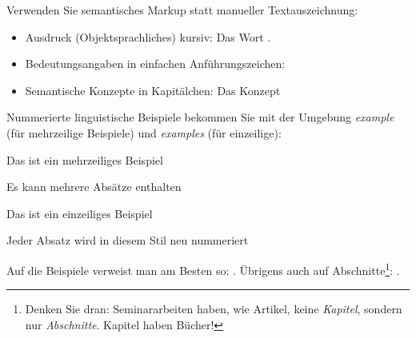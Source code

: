 \documentclass[naustrian]{univie-ling-paper}
\begin{document}
Verwenden Sie semantisches Markup statt manueller Textauszeichnung:
\begin{itemize}
	\item Ausdruck (Objektsprachliches) kursiv: Das Wort .
	\item Bedeutungsangaben in einfachen Anführungszeichen: 
	\item Semantische Konzepte in Kapitälchen: Das Konzept 
\end{itemize}
%
Nummerierte linguistische Beispiele bekommen Sie mit der Umgebung \emph{example} (für mehrzeilige Beispiele) und \emph{examples} (für einzeilige):

\begin{example}
	Das ist ein mehrzeiliges Beispiel
	
	Es kann mehrere Absätze enthalten
\end{example}

\begin{examples}
	\item Das ist ein einzeiliges Beispiel\label{exa:Beispiel-einzeilig}
	\item Jeder Absatz wird in diesem Stil neu nummeriert
\end{examples}
%
Auf die Beispiele verweist man am Besten so: . Übrigens auch auf Abschnitte\footnote{Denken Sie dran: Seminararbeiten haben,
	wie Artikel, keine \emph{Kapitel}, sondern nur \emph{Abschnitte}. Kapitel haben Bücher!}: .

\clearpage
\printbibliography[heading=bibnumbered]
\end{document}
